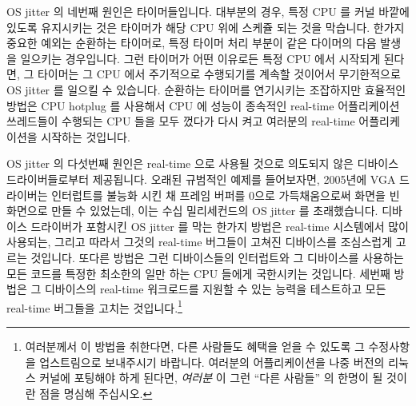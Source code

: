 OS jitter 의 네번째 원인은 타이머들입니다.
대부분의 경우, 특정 CPU 를 커널 바깥에 있도록 유지시키는 것은 타이머가 해당 CPU
위에 스케쥴 되는 것을 막습니다.
한가지 중요한 예외는 순환하는 타이머로, 특정 타이머 처리 부분이 같은 다이머의
다음 발생을 일으키는 경우입니다.
그런 타이머가 어떤 이유로든 특정 CPU 에서 시작되게 된다면, 그 타이머는 그 CPU
에서 주기적으로 수행되기를 계속할 것이어서 무기한적으로 OS jitter 를 일으킬 수
있습니다.
순환하는 타이머를 연기시키는 조잡하지만 효율적인 방법은 CPU hotplug 를 사용해서
CPU 에 성능이 종속적인 real-time 어플리케이션 쓰레드들이 수행되는 CPU 들을 모두
껐다가 다시 켜고 여러분의 real-time 어플리케이션을 시작하는 것입니다.

OS jitter 의 다섯번째 원인은 real-time 으로 사용될 것으로 의도되지 않은
디바이스 드라이버들로부터 제공됩니다.
오래된 규범적인 예제를 들어보자면, 2005년에 VGA 드라이버는 인터럽트를 불능화
시킨 채 프레임 버퍼를 0으로 가득채움으로써 화면을 빈 화면으로 만들 수 있었는데,
이는 수십 밀리세컨드의 OS jitter 를 초래했습니다.
디바이스 드라이버가 포함시킨 OS jitter 를 막는 한가지 방법은 real-time
시스템에서 많이 사용되는, 그리고 따라서 그것의 real-time 버그들이 고쳐진
디바이스를 조심스럽게 고르는 것입니다.
또다른 방법은 그런 디바이스들의 인터럽트와 그 디바이스를 사용하는 모든 코드를
특정한 최소한의 일만 하는 CPU 들에게 국한시키는 것입니다.
세번째 방법은 그 디바이스의 real-time 워크로드를 지원할 수 있는 능력을
테스트하고 모든 real-time 버그들을 고치는 것입니다.\footnote{
	여러분께서 이 방법을 취한다면, 다른 사람들도 혜택을 얻을 수 있도록 그
	수정사항을 업스트림으로 보내주시기 바랍니다.
	여러분의 어플리케이션을 나중 버전의 리눅스 커널에 포팅해야 하게 된다면,
	\emph{여러분} 이 그런 ``다른 사람들'' 의 한명이 될 것이란 점을 명심해
	주십시오.}
\iffalse

